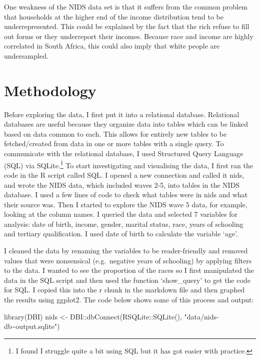 \documentclass[11pt,preprint, authoryear]{elsarticle}
\numberwithin{equation}{section}
\numberwithin{figure}{section}
\numberwithin{table}{section}
\let\rmarkdownfootnote\footnote%
\def\footnote{\protect\rmarkdownfootnote}
\newenvironment{Shaded}{\begin{snugshade}}{\end{snugshade}}
\newcommand{\FunctionTok}[1]{\textcolor[rgb]{0.00,0.00,0.00}{#1}}
\newcommand{\NormalTok}[1]{#1}
\newcommand{\OtherTok}[1]{\textcolor[rgb]{0.56,0.35,0.01}{#1}}
\newcommand{\SpecialCharTok}[1]{\textcolor[rgb]{0.00,0.00,0.00}{#1}}
\newcommand{\StringTok}[1]{\textcolor[rgb]{0.31,0.60,0.02}{#1}}
\begin{document}
One weakness of the NIDS data set is that it suffers from the common
problem that households at the higher end of the income distribution
tend to be underrepresented. This could be explained by the fact that
the rich refuse to fill out forms or they underreport their incomes.
Because race and income are highly correlated in South Africa, this
could also imply that white people are undersampled.

\hypertarget{methodology}{%
\section{\texorpdfstring{Methodology
\label{Meth}}{Methodology }}\label{methodology}}

Before exploring the data, I first put it into a relational database.
Relational databases are useful because they organize data into tables
which can be linked based on data common to each. This allows for
entirely new tables to be fetched/created from data in one or more
tables with a single query. To communicate with the relational database,
I used Structured Query Language (SQL) via SQLite.\footnote{I found I
  struggle quite a bit using SQL but it has got easier with practice.}
To start investigating and visualising the data, I first ran the code in
the R script called SQL. I opened a new connection and called it nids,
and wrote the NIDS data, which included waves 2-5, into tables in the
NIDS database. I used a few lines of code to check what tables were in
nids and what their source was. Then I started to explore the NIDS wave
5 data, for example, looking at the column names. I queried the data and
selected 7 variables for analysis: date of birth, income, gender,
marital status, race, years of schooling and tertiary qualification. I
used date of birth to calculate the variable `age'.

I cleaned the data by renaming the variables to be reader-friendly and
removed values that were nonsensical (e.g.~negative years of schooling)
by applying filters to the data. I wanted to see the proportion of the
races so I first manipulated the data in the SQL script and then used
the function `show\_query' to get the code for SQL. I copied this into
the r chunk in the markdown file and then graphed the results using
ggplot2. The code below shows some of this process and output:

\begin{Shaded}
\begin{Highlighting}[]
\FunctionTok{library}\NormalTok{(DBI)}
\NormalTok{nids }\OtherTok{\textless{}{-}}\NormalTok{ DBI}\SpecialCharTok{::}\FunctionTok{dbConnect}\NormalTok{(RSQLite}\SpecialCharTok{::}\FunctionTok{SQLite}\NormalTok{(), }\StringTok{"data/nids{-}db\textasciitilde{}output.sqlite"}\NormalTok{)}
\end{Highlighting}
\end{Shaded}
\end{document}
